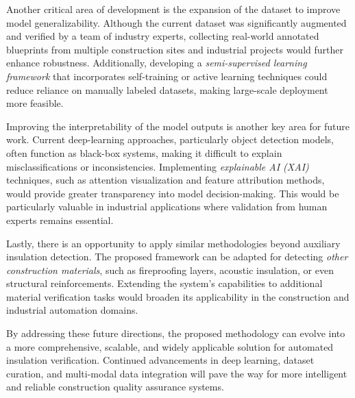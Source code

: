 \documentclass[]{IEEEphot}
\begin{document}
Another critical area of development is the expansion of the dataset to improve model generalizability. Although the current dataset was significantly augmented and verified by a team of industry experts, collecting real-world annotated blueprints from multiple construction sites and industrial projects would further enhance robustness. Additionally, developing a \textit{semi-supervised learning framework} that incorporates self-training or active learning techniques could reduce reliance on manually labeled datasets, making large-scale deployment more feasible.

Improving the interpretability of the model outputs is another key area for future work. Current deep-learning approaches, particularly object detection models, often function as black-box systems, making it difficult to explain misclassifications or inconsistencies. Implementing \textit{explainable AI (XAI)} techniques, such as attention visualization and feature attribution methods, would provide greater transparency into model decision-making. This would be particularly valuable in industrial applications where validation from human experts remains essential.

Lastly, there is an opportunity to apply similar methodologies beyond auxiliary insulation detection. The proposed framework can be adapted for detecting \textit{other construction materials}, such as fireproofing layers, acoustic insulation, or even structural reinforcements. Extending the system’s capabilities to additional material verification tasks would broaden its applicability in the construction and industrial automation domains.

By addressing these future directions, the proposed methodology can evolve into a more comprehensive, scalable, and widely applicable solution for automated insulation verification. Continued advancements in deep learning, dataset curation, and multi-modal data integration will pave the way for more intelligent and reliable construction quality assurance systems.
\end{document}
